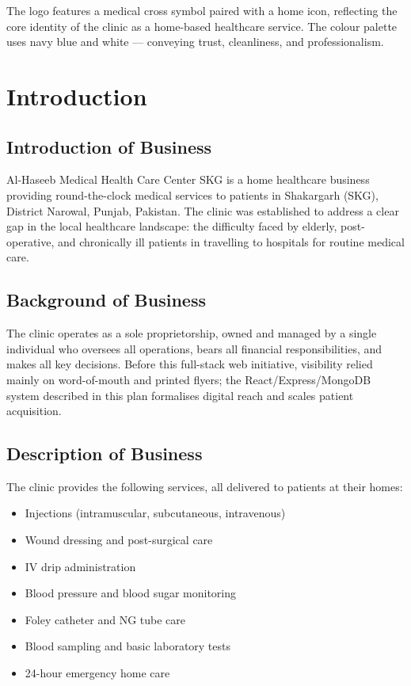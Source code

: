 \documentclass[12pt, a4paper]{article}
\begin{document}
\noindent The logo features a medical cross symbol paired with a home icon, reflecting the core identity of the clinic as a home-based healthcare service. The colour palette uses navy blue and white — conveying trust, cleanliness, and professionalism.

\newpage

\clearpage
\pagestyle{fancy}
\setcounter{page}{1}

\section{Introduction}

\subsection{Introduction of Business}

Al-Haseeb Medical Health Care Center SKG is a home healthcare business providing round-the-clock medical services to patients in Shakargarh (SKG), District Narowal, Punjab, Pakistan. The clinic was established to address a clear gap in the local healthcare landscape: the difficulty faced by elderly, post-operative, and chronically ill patients in travelling to hospitals for routine medical care.

\subsection{Background of Business}

The clinic operates as a sole proprietorship, owned and managed by a single individual who oversees all operations, bears all financial responsibilities, and makes all key decisions. Before this full-stack web initiative, visibility relied mainly on word-of-mouth and printed flyers; the React/Express/MongoDB system described in this plan formalises digital reach and scales patient acquisition.

\subsection{Description of Business}

The clinic provides the following services, all delivered to patients at their homes:

\begin{itemize}[leftmargin=1.4em]
    \item Injections (intramuscular, subcutaneous, intravenous)
    \item Wound dressing and post-surgical care
    \item IV drip administration
    \item Blood pressure and blood sugar monitoring
    \item Foley catheter and NG tube care
    \item Blood sampling and basic laboratory tests
    \item 24-hour emergency home care
\end{itemize}
\end{document}
